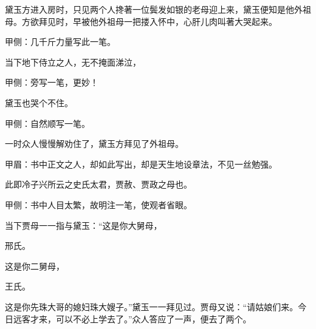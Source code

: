 \begin{parag}
    黛玉方进入房时，只见两个人搀著一位鬓发如银的老母迎上来，黛玉便知是他外祖母。方欲拜见时，早被他外祖母一把搂入怀中，心肝儿肉叫著大哭起来。\begin{note}甲侧：几千斤力量写此一笔。\end{note}当下地下侍立之人，无不掩面涕泣，\begin{note}甲侧：旁写一笔，更妙！\end{note}黛玉也哭个不住。\begin{note}甲侧：自然顺写一笔。\end{note}一时众人慢慢解劝住了，黛玉方拜见了外祖母。\begin{note}甲眉：书中正文之人，却如此写出，却是天生地设章法，不见一丝勉强。\end{note}此即冷子兴所云之史氏太君，贾赦、贾政之母也。\begin{note}甲侧：书中人目太繁，故明注一笔，使观者省眼。\end{note}当下贾母一一指与黛玉：“这是你大舅母，\begin{note}邢氏。\end{note}这是你二舅母，\begin{note}王氏。\end{note}这是你先珠大哥的媳妇珠大嫂子。”黛玉一一拜见过。贾母又说：“请姑娘们来。今日远客才来，可以不必上学去了。”众人答应了一声，便去了两个。
\end{parag}


